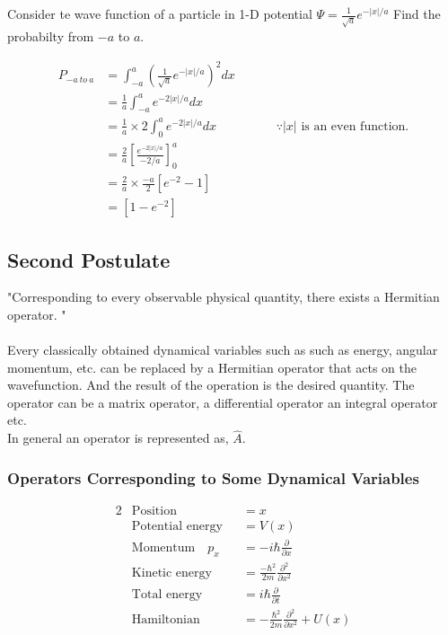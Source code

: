 \begin{exercise}
	Consider te wave function of a particle in 1-D potential $\Psi=\frac{1}{\sqrt{a}} e^{-|x|/a}$ Find the probabilty from $-a$ to $a$.
\end{exercise}
\begin{answer}
	\begin{align*}
	P_{-a \ to\ a}&=\int_{-a}^{a}(\frac{1}{\sqrt{a}}e^{-|x|/a})^{2} dx\\
	&=\frac{1}{{a}}\int_{-a}^{a}e^{-2|x|/a} dx\\
	&=\frac{1}{{a}}\times2\int_{0}^{a}e^{-2|x|/a} dx \hspace{2cm}\because |x|\text{ is an even function.}\\
	&=\frac{2}{{a}} 	\left[\frac{e^{-2|x|/a} }{-2/a} \right]_{0}^{a} \\
	&=\frac{2}{{a}}\times\frac{-a}{2} \left[e^{-2}-1 \right] \\&=\left[1-e^{-2} \right] 
	\end{align*}
\end{answer}
\subsection{Second Postulate }
"Corresponding to every observable physical quantity, there exists a Hermitian operator. "
\\\\ Every classically obtained dynamical variables such as such as energy, angular momentum, etc. can be replaced by a Hermitian operator that acts on the wavefunction. And the result of the operation is the desired quantity. The operator can be a matrix operator, a differential operator an integral operator etc.
\\In general an operator is represented as, $\hat{A}$.\\
\subsubsection{Operators Corresponding to Some Dynamical Variables}
\begin{alignat*}{2}
&\text{Position}&&=x\\
&\text{Potential energy}&&=V(x)\\
&\text{Momentum} \quad p_{x}&&=-i\hbar \frac{\partial}{\partial x}\\
&\text{Kinetic energy}&&=\frac{-\hbar^{2}}{2m} \frac{\partial^{2}}{\partial x^{2}}\\
&\text{Total energy}&&=i\hbar \frac{\partial}{\partial t}\\
&\text{Hamiltonian}&&=-\frac{\hbar^2}{2m}\frac{\partial^2}{\partial x^2}+U(x)
\end{alignat*}
